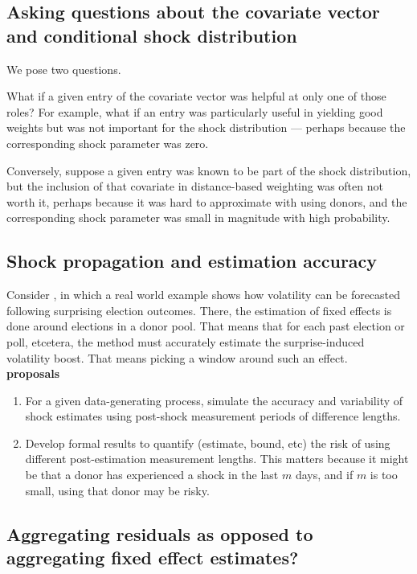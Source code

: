 \documentclass[11pt]{article}
\theoremstyle{definition}
\begin{document}
\subsection{Asking questions about the covariate vector and conditional shock distribution}
We pose two questions.  

What if a given entry of the covariate vector was helpful at only one of those roles?  For example, what if an entry was particularly useful in yielding good weights but was not important for the shock distribution --- perhaps because the corresponding shock parameter was zero.  

Conversely, suppose a given entry was known to be part of the shock distribution, but the inclusion of that covariate in distance-based weighting was often not worth it, perhaps because it was hard to approximate with using donors, and the corresponding shock parameter was small in magnitude with high probability.

\subsection{Shock propagation and estimation accuracy}
Consider \cite{lundquist2024volatility}, in which a real world example shows how volatility can be forecasted following surprising election outcomes.  There, the estimation of fixed effects is done around elections in a donor pool.  That means that for each past election or poll, etcetera, the method must accurately estimate the surprise-induced volatility boost.  That means picking a window around such an effect.\\

\textbf{proposals}
\begin{enumerate}
  \item For a given data-generating process, simulate the accuracy and variability of shock estimates using post-shock measurement periods of difference lengths.
  \item Develop formal results to quantify (estimate, bound, etc) the risk of using different post-estimation measurement lengths.  This matters because it might be that a donor has experienced a shock in the last $m$ days, and if $m$ is too small, using that donor may be risky.
\end{enumerate}
    

\subsection{Aggregating residuals as opposed to aggregating fixed effect estimates?}
\end{document}
